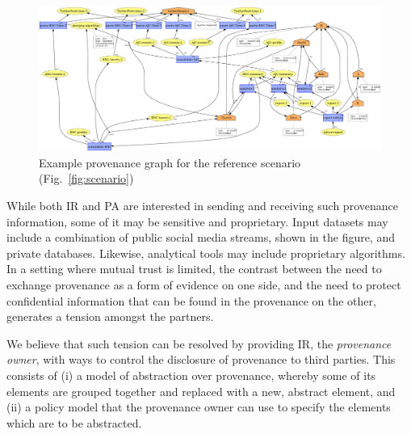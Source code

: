 
%




%
%

%

\begin{figure}
\begin{center}
\includegraphics[width=\textwidth]{figures/IR-agents-delegation.pdf}
\caption{Example provenance graph for the reference scenario (Fig.~\ref{fig:scenario})}
\label{fig:graph-example}
\end{center}
\end{figure}

%
While both IR and PA are interested in sending and receiving such provenance information, some of it may be sensitive and proprietary. 
%
Input datasets may include a combination of public social media streams, shown in the figure, and private databases. Likewise, analytical tools may include proprietary algorithms.
%
In a setting where mutual trust is limited, the contrast between the need to exchange provenance as a form of evidence on one side, and the need to protect confidential information that can be found in the provenance on the other, generates a tension amongst the partners.

%
We believe that such tension can be resolved by providing IR, the \textit{provenance owner}, with ways to control the disclosure of provenance to third parties. This consists of (i) a model of abstraction over provenance, whereby some of its elements are grouped together and replaced with a new, abstract element, and (ii) a policy model that the provenance owner can use to specify the  elements which are to be abstracted.
%

